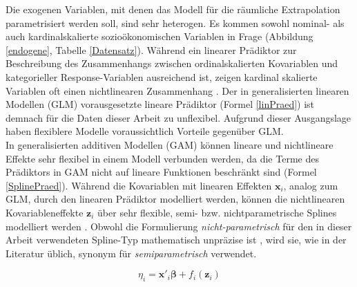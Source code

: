 \documentclass{Vorlage}
\begin{document}
Die exogenen Variablen, mit denen das Modell für die räumliche Extrapolation parametrisiert werden soll, sind sehr heterogen. Es kommen sowohl nominal- als auch kardinalskalierte sozioökonomischen Variablen in Frage (Abbildung \ref{endogene}, Tabelle \ref{Datensatz}). Während ein linearer Prädiktor zur Beschreibung des Zusammenhangs zwischen ordinalskalierten Kovariablen und kategorieller Response-Variablen ausreichend ist, zeigen kardinal skalierte Variablen oft einen nichtlinearen Zusammenhang \cite[p. 9]{fahrmeir2009regression}. Der in generalisierten linearen Modellen (GLM) vorausgesetzte lineare Prädiktor (Formel \ref{linPraed}) ist demnach für die Daten dieser Arbeit zu unflexibel. Aufgrund dieser Ausgangslage haben flexiblere Modelle voraussichtlich Vorteile gegenüber GLM.\\
In generalisierten additiven Modellen (GAM) können lineare und nichtlineare Effekte sehr flexibel in einem Modell verbunden werden, da die Terme des Prädiktors in GAM nicht auf lineare Funktionen beschränkt sind (Formel \ref{SplinePraed}). Während die Kovariablen mit linearen Effekten $\mathbf{x}_i$, analog zum GLM, durch den linearen Prädiktor modelliert werden, können die nichtlinearen Kovariableneffekte $\mathbf{z}_i$ über sehr flexible, semi- bzw. nichtparametrische Splines modelliert werden \cite[p. 1 f.]{wood2016}. Obwohl die Formulierung \textit{nicht-parametrisch} für den in dieser Arbeit verwendeten Spline-Typ mathematisch unpräzise ist \cite[p. 1]{eilers1996}, wird sie, wie in der Literatur üblich, synonym für \textit{semiparametrisch} verwendet.

\begin{equation} \label{SplinePraed}
\eta_{i} =\mathbf{x}'_i \boldsymbol{\beta}+f_{i}(\mathbf{z}_{i})
\end{equation}
\end{document}
